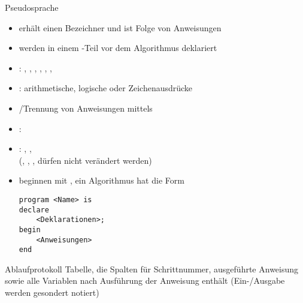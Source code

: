 \begin{Def}{Pseudosprache}
    \begin{itemize}
        \item {} erhält einen Bezeichner und ist Folge von
        Anweisungen
        
        \item {} werden in einem -Teil vor
        dem Algorithmus deklariert
        
        \item {}: , \quad
        , \quad
        , \quad {}, \quad
        , \quad
        , \quad
        
        \item {}: arithmetische, logische oder
        Zeichenausdrücke
        
        \item {}/Trennung von Anweisungen
        mittels \pseudocode{;}
        
        \item {}:
        
        \item {}: , \quad
        , \\
         \quad
        (, , , 
        dürfen nicht verändert werden)
        
        \item {} beginnen mit \pseudocode{{-}{-}}, ein
        Algorithmus hat die Form
        
\begin{lstlisting}[language=pseudosprache]
program <Name> is
declare
    <Deklarationen>;
begin
    <Anweisungen>
end
\end{lstlisting}
    \end{itemize}
\end{Def}

\begin{Def}{Ablaufprotokoll}
    Tabelle, die Spalten für Schrittnummer, ausgeführte Anweisung sowie
    alle Variablen nach Ausführung der Anweisung enthält (Ein-/Ausgabe werden
    gesondert notiert)
\end{Def}

